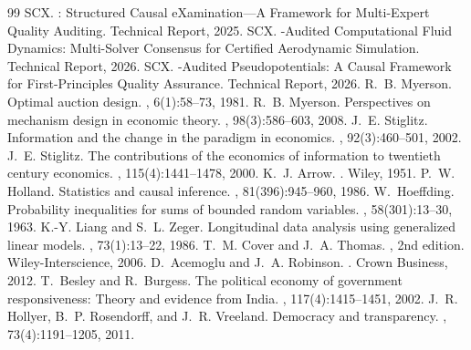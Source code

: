 \documentclass[11pt,a4paper]{article}
\theoremstyle{definition}
\begin{document}
\begin{thebibliography}{99}
SCX.
: Structured Causal eXamination---A Framework for Multi-Expert Quality Auditing.
\newblock Technical Report, 2025.
SCX.
-Audited Computational Fluid Dynamics: Multi-Solver Consensus for Certified Aerodynamic Simulation.
\newblock Technical Report, 2026.
SCX.
-Audited Pseudopotentials: A Causal Framework for First-Principles Quality Assurance.
\newblock Technical Report, 2026.
R.~B. Myerson.
\newblock Optimal auction design.
, 6(1):58--73, 1981.
R.~B. Myerson.
\newblock Perspectives on mechanism design in economic theory.
, 98(3):586--603, 2008.
J.~E. Stiglitz.
\newblock Information and the change in the paradigm in economics.
, 92(3):460--501, 2002.
J.~E. Stiglitz.
\newblock The contributions of the economics of information to twentieth century economics.
, 115(4):1441--1478, 2000.
K.~J. Arrow.
.
\newblock Wiley, 1951.
P.~W. Holland.
\newblock Statistics and causal inference.
, 81(396):945--960, 1986.
W.~Hoeffding.
\newblock Probability inequalities for sums of bounded random variables.
, 58(301):13--30, 1963.
K.-Y. Liang and S.~L. Zeger.
\newblock Longitudinal data analysis using generalized linear models.
, 73(1):13--22, 1986.
T.~M. Cover and J.~A. Thomas.
, 2nd edition.
\newblock Wiley-Interscience, 2006.
D.~Acemoglu and J.~A. Robinson.
.
\newblock Crown Business, 2012.
T.~Besley and R.~Burgess.
\newblock The political economy of government responsiveness: Theory and evidence from India.
, 117(4):1415--1451, 2002.
J.~R. Hollyer, B.~P. Rosendorff, and J.~R. Vreeland.
\newblock Democracy and transparency.
, 73(4):1191--1205, 2011.

\end{thebibliography}
\end{document}
